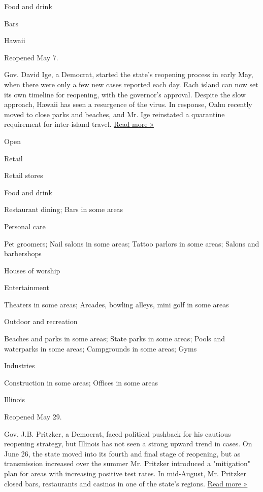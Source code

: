 Food and drink

Bars

Hawaii

Reopened May 7.

Gov. David Ige, a Democrat, started the state's reopening process in
early May, when there were only a few new cases reported each day. Each
island can now set its own timeline for reopening, with the governor's
approval. Despite the slow approach, Hawaii has seen a resurgence of the
virus. In response, Oahu recently moved to close parks and beaches, and
Mr. Ige reinstated a quarantine requirement for inter-island travel.
\href{https://www.civilbeat.org/2020/08/the-interisland-travel-quarantine-is-coming-back-oahu-beaches-and-parks-to-close-again/}{Read
more »}

Open

Retail

Retail stores

Food and drink

Restaurant dining; Bars in some areas

Personal care

Pet groomers; Nail salons in some areas; Tattoo parlors in some areas;
Salons and barbershops

Houses of worship

Entertainment

Theaters in some areas; Arcades, bowling alleys, mini golf in some areas

Outdoor and recreation

Beaches and parks in some areas; State parks in some areas; Pools and
waterparks in some areas; Campgrounds in some areas; Gyms

Industries

Construction in some areas; Offices in some areas

Illinois

Reopened May 29.

Gov. J.B. Pritzker, a Democrat, faced political pushback for his
cautious reopening strategy, but Illinois has not seen a strong upward
trend in cases. On June 26, the state moved into its fourth and final
stage of reopening, but as transmission increased over the summer Mr.
Pritzker introduced a "mitigation" plan for areas with increasing
positive test rates. In mid-August, Mr. Pritzker closed bars,
restaurants and casinos in one of the state's regions.
\href{https://www.wbez.org/stories/use-this-tool-to-track-illinois-reopening-plan-by-phase-region-and-address/51871836-6a73-47dc-a8f1-18c6fe2f2a6e}{Read
more »}

